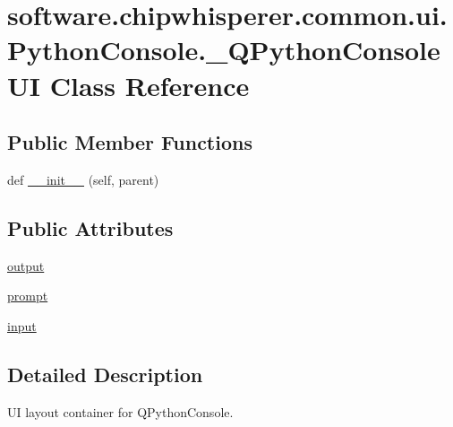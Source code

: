 \hypertarget{classsoftware_1_1chipwhisperer_1_1common_1_1ui_1_1PythonConsole_1_1__QPythonConsoleUI}{}\section{software.\+chipwhisperer.\+common.\+ui.\+Python\+Console.\+\_\+\+Q\+Python\+Console\+U\+I Class Reference}
\label{classsoftware_1_1chipwhisperer_1_1common_1_1ui_1_1PythonConsole_1_1__QPythonConsoleUI}
\subsection*{Public Member Functions}
\begin{DoxyCompactItemize}
\item 
def \hyperlink{classsoftware_1_1chipwhisperer_1_1common_1_1ui_1_1PythonConsole_1_1__QPythonConsoleUI_a24e95cb095e8c779fa050ff9930ed59a}{\+\_\+\+\_\+init\+\_\+\+\_\+} (self, parent)
\end{DoxyCompactItemize}
\subsection*{Public Attributes}
\begin{DoxyCompactItemize}
\item 
\hyperlink{classsoftware_1_1chipwhisperer_1_1common_1_1ui_1_1PythonConsole_1_1__QPythonConsoleUI_abf915822ac4181722e15c01246bbf4c5}{output}
\item 
\hyperlink{classsoftware_1_1chipwhisperer_1_1common_1_1ui_1_1PythonConsole_1_1__QPythonConsoleUI_afaaabc93a25a45840aa2a6babcdca2ef}{prompt}
\item 
\hyperlink{classsoftware_1_1chipwhisperer_1_1common_1_1ui_1_1PythonConsole_1_1__QPythonConsoleUI_abf09ccb74a97849113141a1b15daa8e4}{input}
\end{DoxyCompactItemize}


\subsection{Detailed Description}
\begin{DoxyVerb}UI layout container for QPythonConsole.\end{DoxyVerb}
 

